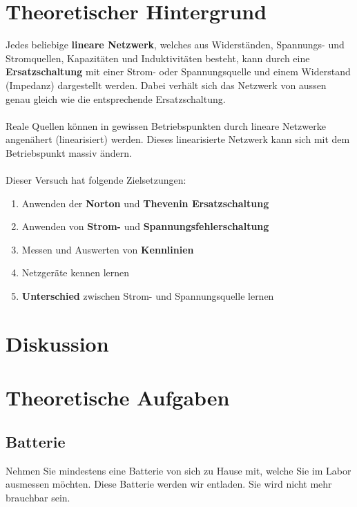 \section{Theoretischer Hintergrund}
Jedes beliebige \textbf{lineare Netzwerk}, welches aus Widerständen, Spannungs- und Stromquellen, 
Kapazitäten und Induktivitäten besteht, kann durch eine \textbf{Ersatzschaltung} mit einer
Strom- oder Spannungsquelle und einem Widerstand (Impedanz) dargestellt werden. Dabei verhält
sich das Netzwerk von aussen genau gleich wie die entsprechende Ersatzschaltung.
\\\\
Reale Quellen können in gewissen Betriebspunkten durch lineare Netzwerke angenähert (linearisiert) werden. Dieses linearisierte Netzwerk kann sich mit dem Betriebspunkt massiv
ändern.
\\\\
Dieser Versuch hat folgende Zielsetzungen:
\begin{enumerate}[$a)$]
\item Anwenden der \textbf{Norton} und \textbf{Thevenin Ersatzschaltung}
\item Anwenden von \textbf{Strom-} und \textbf{Spannungsfehlerschaltung}
\item Messen und Auswerten von \textbf{Kennlinien}
\item Netzgeräte kennen lernen
\item \textbf{Unterschied} zwischen Strom- und Spannungsquelle lernen
\end{enumerate}
\section{Diskussion}
\section{Theoretische Aufgaben}
\subsection{Batterie}
Nehmen Sie mindestens eine Batterie von sich zu Hause mit, welche Sie im Labor ausmessen
möchten. Diese Batterie werden wir entladen. Sie wird nicht mehr brauchbar sein.
